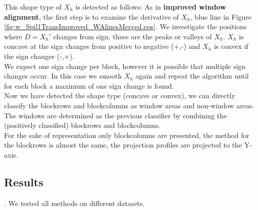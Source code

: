This shape type of $X_h$ is detected as follows:
As in \textbf{improved window alignment}, the first step is to examine the derivative of $X_h$, blue line in Figure \ref{fig:w_Spil1TransImproved_WAlinesMerged.eps}.
We investigate the positions where $D=X_{h}'$ changes from sign, these are the peaks or valleys of $X_h$. $X_h$ is concave at the sign changes from positive to negative (+,-) and $X_h$ is convex if the sign changes (-,+).\\

We expect one sign change per block, however it is possible that multiple sign changes occur. In this case we smooth $X_h$ again and repeat the algorithm until for each block a maximum of one sign change is found. \\

Now we have detected the shape type (concave or convex), we can directly classify the blockrows and blockcolumns as window areas and non-window areas. The windows are determined as the previous classifier by combining the (positively classified) blockrows and blockcolumns.\\

For the sake of representation only blockcolumns are presented, the method for the blockrows is almost the same, the projection profiles are projected to the Y-axis.

\subsection{Results}
\label{sec:results}.
We tested all methods on different datasets.

\newpage
{}





